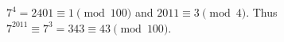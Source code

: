 $7^4=2401\equiv1\pmod{100}$ and $2011\equiv3\pmod4$. Thus $7^{2011}\equiv7^3=343\equiv\boxed{43}\pmod{100}$.
